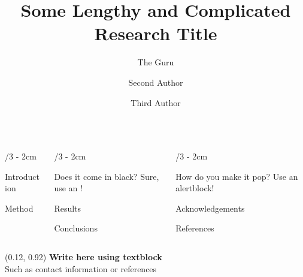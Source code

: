 \documentclass[landscape]{uioposter}
\title{Some Lengthy and Complicated Research Title}
\author
{%
    The Guru%
    \and
    Second Author%
    \and
    Third Author%
}
\begin{document}
\begin{frame}
\begin{columns}[onlytextwidth]


\begin{column}{\textwidth/3 - 2cm}
    \begin{block}{Introduction}
        \lipsum[1]
    \end{block}

    \begin{block}{Method}
        \lipsum[2]
    \end{block}
\end{column}


\begin{column}{\textwidth/3 - 2cm}
    \begin{exampleblock}{Does it come in black?}
        Sure, use an !
    \end{exampleblock}

    \begin{block}{Results}
        \lipsum[75]
        \unskip
    \end{block}

    \begin{block}{Conclusions}
        \lipsum[6]
    \end{block}
\end{column}


\begin{column}{\textwidth/3 - 2cm}
    \begin{alertblock}{How do you make it pop?}
        Use an \alert{alertblock}!
    \end{alertblock}

    \begin{block}{Acknowledgements}
        \lipsum[4]
    \end{block}

    \begin{block}{References}
       \lipsum[6]
    \end{block}
\end{column}


\end{columns}


\begin{textblock}{0.5}(0.12, 0.92)
    \color{white}
    \sffamily
    \textbf{Write here using textblock}
    \\
    Such as contact information or references
\end{textblock}


\end{frame}
\end{document}
